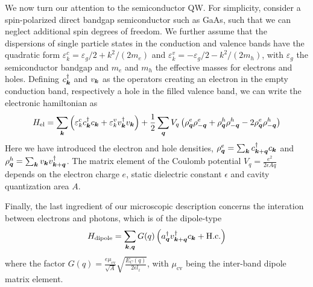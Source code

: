 We now turn our attention to the semiconductor QW. For simplicity,
consider a spin-polarized direct bandgap semiconductor such as GaAs,
such that we can neglect additional spin degrees of freedom. We
further assume that the dispersions of single particle states in the
conduction and valence bands have the quadratic form
$\varepsilon^c_{k} = \varepsilon_g/2 + k^2/(2m_e)$ and
$\varepsilon^v_{k} = - \varepsilon_g/2 - k^2/(2m_h)$, with
$\varepsilon_g$ the semiconductor bandgap and $m_e$ and $m_h$ the
effective masses for electrons and holes. Defining $c_{\bm{k}}^{\dagger}$
and $v_{\bm{k}}$ as the operators creating an electron in the empty
conduction band, respectively a hole in the filled valence band, we
can write the electronic hamiltonian as
%
\begin{equation}\label{eq:coulomb-hamiltonian}
  H_{\text{el}} = \sum_{\bm{k}} \left( \varepsilon^c_k c_{\bm{k}}^{\dagger} c_{\bm{k}} + \varepsilon^v_k v_{\bm{k}}^{\dagger} v_{\bm{k}} \right) + \frac{1}{2}\sum_{\bm{q}} V_q \left( \rho^e_{\bm{q}} \rho^e_{-\bm{q}} + \rho^h_{\bm{q}} \rho^h_{-\bm{q}} -2 \rho^e_{\bm{q}} \rho^h_{-\bm{q}}\right)
\end{equation}
% 
Here we have introduced the electron and hole densities,
$\rho^e_{\bm{q}} = \sum_{\bm{k}} c_{\bm{k} + \bm{q}}^{\dagger} c_{\bm{k}}$ and
$\rho^h_{\bm{q}} = \sum_{\bm{k}} v_{\bm{k}} v_{\bm{k} + \bm{q}}^{\dagger}$. The
matrix element of the Coulomb potential
$V_q = \frac{e^2}{2 \epsilon A q}$ depends on the electron charge $e$,
static dielectric constant $\epsilon$ and cavity quantization area
$A$.

Finally, the last ingredient of our microscopic description concerns
the interation between electrons and photons, which is of the dipole-type
%
\begin{equation}\label{eq:dipolar-inter}
  H_{\text{dipole}} = \sum_{\bm{k}, \bm{q}} G(q) \left( a_{\bm{q}}^{\dagger} v_{\bm{k} + \bm{q}}^{\dagger} c_{\bm{k}} + \text{H.c.}\right)
\end{equation}
% 
where the factor
$G(q) = \frac{e
  \mu_{\text{cv}}}{\sqrt{A}}\sqrt{\frac{E_C(q)}{2\epsilon l_z}}$, with
$\mu_{\text{cv}}$ being the inter-band dipole matrix element.

